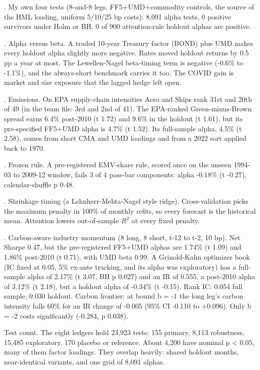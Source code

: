\par{}. My own four tests (8-and-8 legs, FF5+UMD+commodity controls, the source of the HML loading, uniform 5/10/25 bp costs): 8,091 alpha tests, 0 positive survivors under Holm or BH. 0 of 900 attention-rule holdout alphas are positive.
\par{}. Alpha versus beta. A traded 10-year Treasury factor (BOND) plus UMD makes every holdout alpha slightly more negative. Rates moved holdout returns by 0.5 pp a year at most. The Lewellen-Nagel beta-timing term is negative (-0.6\% to -1.1\%), and the always-short benchmark carries it too. The COVID gain is market and size exposure that the lagged hedge left open.
\par{}. Emissions. On EPA supply-chain intensities Aero and Ships rank 31st and 20th of 49 (in the team file: 3rd and 2nd of 41). The EPA-ranked Green-minus-Brown spread earns 6.4\% post-2010 (t 1.72) and 9.6\% in the holdout (t 1.61), but its pre-specified FF5+UMD alpha is 4.7\% (t 1.52). Its full-sample alpha, 4.5\% (t 2.58), comes from short CMA and UMD loadings and from a 2022 sort applied back to 1970.
\par{}. Frozen rule. A pre-registered EMV-share rule, scored once on the unseen 1994-03 to 2009-12 window, fails 3 of 4 pass-bar components: alpha -0.18\% (t -0.27), calendar-shuffle p 0.48.
\par{}. Shrinkage timing (a Lehnherr-Mehta-Nagel style ridge). Cross-validation picks the maximum penalty in 100\% of monthly refits, so every forecast is the historical mean. Attention lowers out-of-sample $R^2$ at every fixed penalty.
\par{}. Carbon-aware industry momentum (8 long, 8 short, t-12 to t-2, 10 bp). Net Sharpe 0.47, but the pre-registered FF5+UMD alphas are 1.74\% (t 1.09) and 1.86\% post-2010 (t 0.71), with UMD beta 0.99. A Grinold-Kahn optimizer book (IC fixed at 0.05, 5\% ex-ante tracking, and its alpha was exploratory) has a full-sample alpha of 2.17\% (t 3.07, BH p 0.027) and an IR of 0.555, a post-2010 alpha of 3.12\% (t 2.18), but a holdout alpha of -0.34\% (t -0.15). Rank IC: 0.054 full sample, 0.030 holdout. Carbon frontier: at bound b = -1 the long leg's carbon intensity falls 60\% for an IR change of -0.005 (95\% CI -0.110 to +0.096). Only b = -2 costs significantly (-0.284, p 0.038).
\medskip
\par\noindent Test count. The eight ledgers hold 23,923 tests: 155 primary, 8,113 robustness, 15,485 exploratory, 170 placebo or reference. About 4,200 have nominal p \textless{} 0.05, many of them factor loadings. They overlap heavily: shared holdout months, near-identical variants, and one grid of 8,091 alphas.

